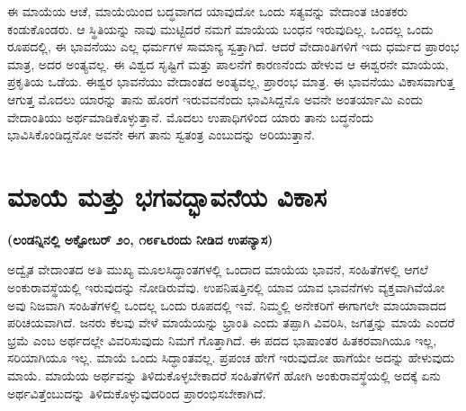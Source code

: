 \vskip 2pt

ಈ ಮಾಯೆಯ ಆಚೆ, ಮಾಯೆಯಿಂದ ಬದ್ಧವಾಗದ ಯಾವುದೋ ಒಂದು ಸತ್ಯವನ್ನು ವೇದಾಂತ ಚಿಂತಕರು ಕಂಡುಕೊಂಡರು. ಆ ಸ್ಥಿತಿಯನ್ನು ನಾವು ಮುಟ್ಟಿದರೆ ನಮಗೆ ಮಾಯೆಯ ಬಂಧನ ಇರುವುದಿಲ್ಲ. ಒಂದಲ್ಲ ಒಂದು ರೂಪದಲ್ಲಿ, ಈ ಭಾವನೆಯು ಎಲ್ಲ ಧರ್ಮಗಳ ಸಾಮಾನ್ಯ ಸ್ವತ್ತಾಗಿದೆ. ಆದರೆ ವೇದಾಂತಿಗಳಿಗೆ ಇದು ಧರ್ಮದ ಪ್ರಾರಂಭ ಮಾತ್ರ, ಅದರ ಅಂತ್ಯವಲ್ಲ. ಈ ವಿಶ್ವದ ಸೃಷ್ಟಿಗೆ ಮತ್ತು ಪಾಲನೆಗೆ ಕಾರಣನೆಂದು ಹೇಳುವ ಆ ಈಶ್ವರನೇ ಮಾಯೆಯ, ಪ್ರಕೃತಿಯ ಒಡೆಯ. ಈಶ್ವರ ಭಾವನೆಯು ವೇದಾಂತದ ಅಂತ್ಯವಲ್ಲ, ಪ್ರಾರಂಭ ಮಾತ್ರ. ಈ ಭಾವನೆಯು ವಿಕಾಸವಾಗುತ್ತ ಆಗುತ್ತ ಮೊದಲು ಯಾರನ್ನು ತಾನು ಹೊರಗೆ ಇರುವವನೆಂದು ಭಾವಿಸಿದ್ದನೊ ಅವನೇ ಅಂತರ್ಯಾಮಿ ಎಂದು ವೇದಾಂತಿಯು ಅರ್ಥಮಾಡಿಕೊಳ್ಳುತ್ತಾನೆ. ಮೊದಲು ಉಪಾಧಿಗಳಿಂದ ಯಾರು ತಾನು ಬದ್ಧನೆಂದು ಭಾವಿಸಿಕೊಂಡಿದ್ದನೋ ಅವನೇ ಈಗ ತಾನು ಸ್ವತಂತ್ರ ಎಂಬುದನ್ನು ಅರಿಯುತ್ತಾನೆ.

\chapter{ಮಾಯೆ ಮತ್ತು ಭಗವದ್ಭಾವನೆಯ ವಿಕಾಸ}%

\centerline{\textbf{(ಲಂಡನ್ನಿನಲ್ಲಿ ಅಕ್ಟೋಬರ್​ ೨೦, ೧೮೯೬ರಂದು ನೀಡಿದ ಉಪನ್ಯಾಸ)}}

\vskip 4pt

ಅದ್ವೈತ ವೇದಾಂತದ ಅತಿ ಮುಖ್ಯ ಮೂಲಸಿದ್ಧಾಂತಗಳಲ್ಲಿ ಒಂದಾದ ಮಾಯೆಯ ಭಾವನೆ, ಸಂಹಿತೆಗಳಲ್ಲಿ ಆಗಲೆ ಅಂಕುರಾವಸ್ಥೆಯಲ್ಲಿ ಇರುವುದನ್ನು ನೋಡಿರುವೆವು. ಉಪನಿಷತ್ತಿನಲ್ಲಿ ಯಾವ ಯಾವ ಭಾವನೆಗಳು ವ್ಯಕ್ತವಾಗಿವೆಯೋ ಅವು ನಿಜವಾಗಿ ಸಂಹಿತೆಗಳಲ್ಲಿ ಒಂದಲ್ಲ ಒಂದು ರೂಪದಲ್ಲಿ ಇವೆ. ನಿಮ್ಮಲ್ಲಿ ಅನೇಕರಿಗೆ ಈಗಾಗಲೇ ಮಾಯಾವಾದದ ಪರಿಚಯವಾಗಿದೆ. ಜನರು ಕೆಲವು ವೇಳೆ ಮಾಯೆಯನ್ನು ಭ್ರಾಂತಿ ಎಂದು ತಪ್ಪಾಗಿ ವಿವರಿಸಿ, ಜಗತ್ತನ್ನು ಮಾಯೆ ಎಂದರೆ ಭ್ರಮೆ ಎಂಬ ಅರ್ಥದಲ್ಲೇ ವಿವರಿಸುವುದು ನಿಮಗೆ ಗೊತ್ತಾಗಿದೆ. ಈ ಪದದ ಭಾಷಾಂತರ ಹಿತಕರವಾಗಿಯೂ ಇಲ್ಲ, ಸರಿಯಾಗಿಯೂ ಇಲ್ಲ. ಮಾಯೆ ಒಂದು ಸಿದ್ಧಾಂತವಲ್ಲ. ಪ್ರಪಂಚ ಹೇಗೆ ಇರುವುದೋ ಹಾಗೆಯೇ ಅದನ್ನು ಹೇಳುವುದು ಮಾಯೆ. ಮಾಯೆಯ ಅರ್ಥವನ್ನು ತಿಳಿದುಕೊಳ್ಳಬೇಕಾದರೆ ಸಂಹಿತೆಗಳಿಗೆ ಹೋಗಿ ಅಂಕುರಾವಸ್ಥೆಯಲ್ಲಿ ಅದಕ್ಕೆ ಏನು ಅರ್ಥವಿತ್ತೆಂಬುದನ್ನು ತಿಳಿದುಕೊಳ್ಳುವುದರಿಂದ ಪ್ರಾರಂಭಿಸಬೇಕಾಗಿದೆ.

\vskip 0.2cm

